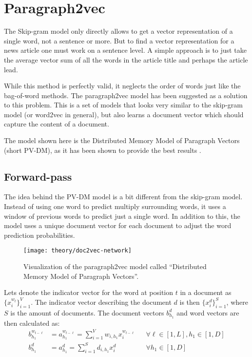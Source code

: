 
\section{Paragraph2vec}

The Skip-gram model only directly allows to get a vector representation of a single word, not a sentence or more. But to find a vector representation for a news article one must work on a sentence level. A simple approach is to just take the average vector sum of all the words in the article title and perhaps the article lead.

While this method is perfectly valid, it neglects the order of words just like the bag-of-word methods. The paragraph2vec model has been suggested as a solution to this problem. This is a set of models that looks very similar to the skip-gram model (or word2vec in general), but also learns a document vector which should capture the content of a document.

The model shown here is the Distributed Memory Model of Paragraph Vectors (short PV-DM), as it has been shown to provide the best results \cite{doc2vec}.

\subsection{Forward-pass}

The idea behind the PV-DM model is a bit different from the skip-gram model. Instead of using one word to predict multiply surrounding words, it uses a window of previous words to predict just a single word. In addition to this, the model uses a unique document vector for each document to adjust the word prediction probabilities.

\begin{figure}[H]
	\centering
	\texttt{[image: theory/doc2vec-network]}
	\caption{Visualization of the paragraph2vec model called ``Distributed Memory Model of Paragraph Vectors''.}
	\label{fig:theory:doc2vec:network}
\end{figure}

Lets denote the indicator vector for the word at position $t$ in a document as $\{x_i^{w_t}\}_{i=1}^V$. The indicator vector describing the document $d$ is then $\{x_i^d\}_{i=1}^S$, where $S$ is the amount of documents. The document vectors $b_{h_1}^d$ and word vectors are then calculated as:
\begin{equation}
\begin{aligned}
b_{h_1}^{w_{t-\ell}} &= a_{h_1}^{w_{t-\ell}} = \sum_{i=1}^V w_{i,h_1} x_{i}^{w_{t-\ell}} && \forall \ell \in [1, L], h_1 \in [1, D] \\
b_{h_1}^d &= a_{h_1}^d = \sum_{i=1}^S d_{i,h_1} x_{i}^d && \forall h_1 \in [1, D]
\end{aligned}
\end{equation}

